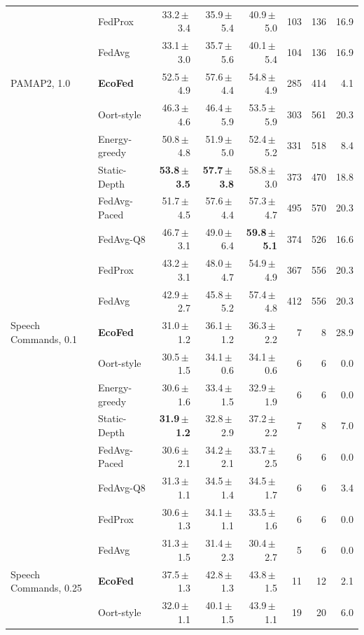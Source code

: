 \begin{tabular}{@{}llrrrrrr@{}}
 & FedProx & 33.2\,$\pm$\,3.4 & 35.9\,$\pm$\,5.4 & 40.9\,$\pm$\,5.0 & 103 & 136 & 16.9\\
 & FedAvg & 33.1\,$\pm$\,3.0 & 35.7\,$\pm$\,5.6 & 40.1\,$\pm$\,5.4 & 104 & 136 & 16.9\\
\midrule
PAMAP2, 1.0 & \textbf{EcoFed} & 52.5\,$\pm$\,4.9 & 57.6\,$\pm$\,4.4 & 54.8\,$\pm$\,4.9 & 285 & 414 & 4.1\\
 & Oort-style & 46.3\,$\pm$\,4.6 & 46.4\,$\pm$\,5.9 & 53.5\,$\pm$\,5.9 & 303 & 561 & 20.3\\
 & Energy-greedy & 50.8\,$\pm$\,4.8 & 51.9\,$\pm$\,5.0 & 52.4\,$\pm$\,5.2 & 331 & 518 & 8.4\\
 & Static-Depth & \textbf{53.8\,$\pm$\,3.5} & \textbf{57.7\,$\pm$\,3.8} & 58.8\,$\pm$\,3.0 & 373 & 470 & 18.8\\
 & FedAvg-Paced & 51.7\,$\pm$\,4.5 & 57.6\,$\pm$\,4.4 & 57.3\,$\pm$\,4.7 & 495 & 570 & 20.3\\
 & FedAvg-Q8 & 46.7\,$\pm$\,3.1 & 49.0\,$\pm$\,6.4 & \textbf{59.8\,$\pm$\,5.1} & 374 & 526 & 16.6\\
 & FedProx & 43.2\,$\pm$\,3.1 & 48.0\,$\pm$\,4.7 & 54.9\,$\pm$\,4.9 & 367 & 556 & 20.3\\
 & FedAvg & 42.9\,$\pm$\,2.7 & 45.8\,$\pm$\,5.2 & 57.4\,$\pm$\,4.8 & 412 & 556 & 20.3\\
\midrule
Speech Commands, 0.1 & \textbf{EcoFed} & 31.0\,$\pm$\,1.2 & 36.1\,$\pm$\,1.2 & 36.3\,$\pm$\,2.2 & 7 & 8 & 28.9\\
 & Oort-style & 30.5\,$\pm$\,1.5 & 34.1\,$\pm$\,0.6 & 34.1\,$\pm$\,0.6 & 6 & 6 & 0.0\\
 & Energy-greedy & 30.6\,$\pm$\,1.6 & 33.4\,$\pm$\,1.5 & 32.9\,$\pm$\,1.9 & 6 & 6 & 0.0\\
 & Static-Depth & \textbf{31.9\,$\pm$\,1.2} & 32.8\,$\pm$\,2.9 & 37.2\,$\pm$\,2.2 & 7 & 8 & 7.0\\
 & FedAvg-Paced & 30.6\,$\pm$\,2.1 & 34.2\,$\pm$\,2.1 & 33.7\,$\pm$\,2.5 & 6 & 6 & 0.0\\
 & FedAvg-Q8 & 31.3\,$\pm$\,1.1 & 34.5\,$\pm$\,1.4 & 34.5\,$\pm$\,1.7 & 6 & 6 & 3.4\\
 & FedProx & 30.6\,$\pm$\,1.3 & 34.1\,$\pm$\,1.1 & 33.5\,$\pm$\,1.6 & 6 & 6 & 0.0\\
 & FedAvg & 31.3\,$\pm$\,1.5 & 31.4\,$\pm$\,2.3 & 30.4\,$\pm$\,2.7 & 5 & 6 & 0.0\\
\midrule
Speech Commands, 0.25 & \textbf{EcoFed} & 37.5\,$\pm$\,1.3 & 42.8\,$\pm$\,1.3 & 43.8\,$\pm$\,1.5 & 11 & 12 & 2.1\\
 & Oort-style & 32.0\,$\pm$\,1.1 & 40.1\,$\pm$\,1.5 & 43.9\,$\pm$\,1.1 & 19 & 20 & 6.0\\

\end{tabular}
